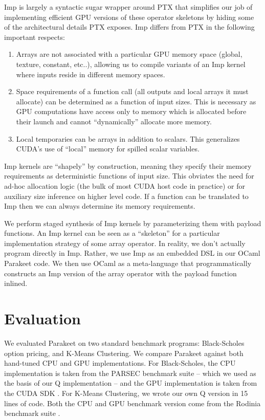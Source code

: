 \documentclass[preprint]{sigplanconf}
\begin{document}
Imp is largely a syntactic sugar wrapper around PTX that simplifies our job of implementing efficient GPU versions of these operator skeletons by hiding some of the architectural details PTX exposes. Imp differs from PTX in the following important respects:

\begin{enumerate}
\item  Arrays are not associated with a particular GPU memory space (global, texture, constant, etc..), allowing us to compile variants of an Imp kernel where inputs reside in different memory spaces.

\item Space requirements of a function call (all outputs and local arrays it must allocate) can be determined as a function of input sizes. This is necessary as GPU computations have access only to memory which is allocated before their launch and cannot ``dynamically'' allocate more memory.

\item Local temporaries can be arrays in addition to scalars. This generalizes CUDA's use of ``local'' memory for spilled scalar variables.
\end{enumerate}
Imp kernels are ``shapely'' by construction, meaning they specify their memory requirements as deterministic functions of input size. This obviates the need for ad-hoc allocation logic (the bulk of most CUDA host code in practice) or for auxiliary size inference on higher level code. If a function can be translated to Imp then we can always determine its memory requirements.

We perform staged synthesis of Imp kernels by parameterizing them with payload functions. An Imp kernel can be seen as a ``skeleton'' \cite{Cole04} for a particular implementation strategy of some array operator. In reality, we don't actually program directly in Imp.  Rather, we use Imp as an embedded DSL in our OCaml Parakeet code.  We then use OCaml as a meta-language that programmatically constructs an Imp version of the array operator with the payload function inlined.

\section{Evaluation}
\label{Evaluation}

We evaluated Parakeet on two standard benchmark programs: Black-Scholes option pricing, and K-Means Clustering.  We compare Parakeet against both hand-tuned CPU and GPU implementations.  For Black-Scholes, the CPU implementation is taken from the PARSEC \cite{Bien08} benchmark suite -- which we used as the basis
of our Q implementation -- and the GPU implementation is taken from the CUDA SDK \cite{NvidSD}.  For K-Means Clustering, we wrote our own Q version in 15 lines of code.  Both the CPU and GPU benchmark version come from the Rodinia benchmark suite \cite{Che09}.
\end{document}
